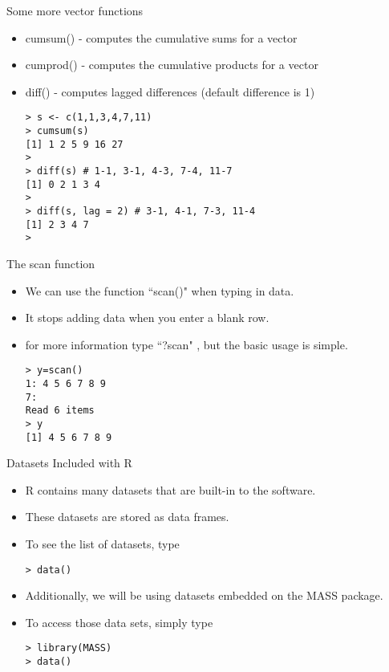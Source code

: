 \documentclass[pdf,default,slideColor,colorBG]{prosper}
\begin{document}
\begin{slide}{Some more vector functions}
\begin{itemize}
\item cumsum()  - computes the cumulative sums for a vector
\item cumprod() - computes the cumulative products for a vector
\item diff()  - computes lagged  differences (default difference is 1)

\begin{verbatim}
> s <- c(1,1,3,4,7,11)
> cumsum(s)
[1] 1 2 5 9 16 27
>
> diff(s) # 1-1, 3-1, 4-3, 7-4, 11-7
[1] 0 2 1 3 4
>
> diff(s, lag = 2) # 3-1, 4-1, 7-3, 11-4
[1] 2 3 4 7
>
\end{verbatim}
\end{itemize}
\end{slide}




\begin{slide}{The scan function}
\begin{itemize}
\item We can use the function  ``scan()" when typing in data.
\item It stops adding data when you enter a blank row.
\item for more information type ``?scan" , but the basic usage is simple.

\begin{verbatim}
> y=scan()
1: 4 5 6 7 8 9
7:
Read 6 items
> y
[1] 4 5 6 7 8 9
\end{verbatim}
\end{itemize}
\end{slide}



\begin{slide}{Datasets Included with R}
\begin{itemize}
\item R contains many datasets that are built-in to the software. \item These datasets are stored as data
frames. \item To see the list of datasets, type
\begin{verbatim}
> data()
\end{verbatim}
\item Additionally, we will be using datasets embedded on the MASS package.
\item To access those data sets, simply type
\begin{verbatim}
> library(MASS)
> data()
\end{verbatim}
\end{itemize}
\end{slide}
\end{document}
